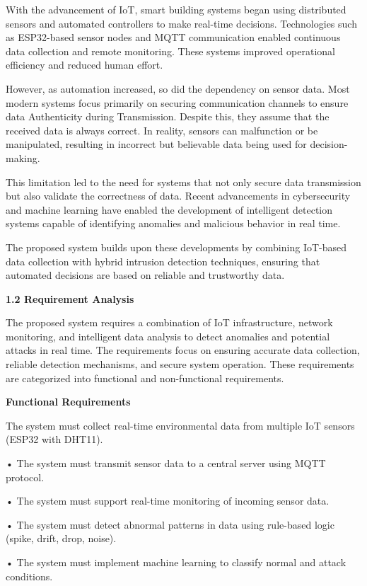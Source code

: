 With the advancement of IoT, smart building systems began using
distributed sensors and automated controllers to make real-time
decisions. Technologies such as ESP32-based sensor nodes and MQTT
communication enabled continuous data collection and remote monitoring.
These systems improved operational efficiency and reduced human effort.

However, as automation increased, so did the dependency on sensor data.
Most modern systems focus primarily on securing communication channels
to ensure data Authenticity during Transmission. Despite this, they
assume that the received data is always correct. In reality, sensors can
malfunction or be manipulated, resulting in incorrect but believable
data being used for decision-making.

This limitation led to the need for systems that not only secure data
transmission but also validate the correctness of data. Recent
advancements in cybersecurity and machine learning have enabled the
development of intelligent detection systems capable of identifying
anomalies and malicious behavior in real time.

The proposed system builds upon these developments by combining
IoT-based data collection with hybrid intrusion detection techniques,
ensuring that automated decisions are based on reliable and trustworthy
data.

\textbf{1.2 Requirement Analysis}

The proposed system requires a combination of IoT infrastructure,
network monitoring, and intelligent data analysis to detect anomalies
and potential attacks in real time. The requirements focus on ensuring
accurate data collection, reliable detection mechanisms, and secure
system operation. These requirements are categorized into functional and
non-functional requirements.

\textbf{Functional Requirements}

The system must collect real-time environmental data from multiple IoT
sensors (ESP32 with DHT11).

• The system must transmit sensor data to a central server using MQTT
protocol.

• The system must support real-time monitoring of incoming sensor data.

• The system must detect abnormal patterns in data using rule-based
logic (spike, drift, drop, noise).

• The system must implement machine learning to classify normal and
attack conditions.

